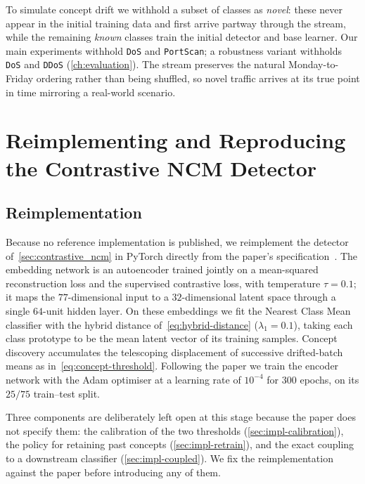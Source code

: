 To simulate concept drift we withhold a subset of classes as \emph{novel}: these never appear in the initial training data and first arrive partway through the stream, while the remaining \emph{known} classes train the initial detector and base learner. Our main experiments withhold \texttt{DoS} and \texttt{PortScan}; a robustness variant withholds \texttt{DoS} and \texttt{DDoS} (\cref{ch:evaluation}). The stream preserves the natural Monday-to-Friday ordering rather than being shuffled, so novel traffic arrives at its true point in time mirroring a real-world scenario.

\section{Reimplementing and Reproducing the Contrastive NCM Detector}
\label{sec:impl-reproduction}

\subsection{Reimplementation}
\label{sec:impl-reimpl}
Because no reference implementation is published, we reimplement the detector of~\cref{sec:contrastive_ncm} in PyTorch directly from the paper's specification~\cite{Kuppa_2022}. The embedding network is an autoencoder trained jointly on a mean-squared reconstruction loss and the supervised contrastive loss, with temperature $\tau = 0.1$; it maps the $77$-dimensional input to a $32$-dimensional latent space through a single $64$-unit hidden layer. On these embeddings we fit the Nearest Class Mean classifier with the hybrid distance of~\cref{eq:hybrid-distance} ($\lambda_1 = 0.1$), taking each class prototype to be the mean latent vector of its training samples. Concept discovery accumulates the telescoping displacement of successive drifted-batch means as in~\cref{eq:concept-threshold}. Following the paper we train the encoder network with the Adam optimiser at a learning rate of $10^{-4}$ for $300$ epochs, on its $25/75$ train--test split.

Three components are deliberately left open at this stage because the paper does not specify them: the calibration of the two thresholds (\cref{sec:impl-calibration}), the policy for retaining past concepts (\cref{sec:impl-retrain}), and the exact coupling to a downstream classifier (\cref{sec:impl-coupled}). We fix the reimplementation against the paper before introducing any of them.


